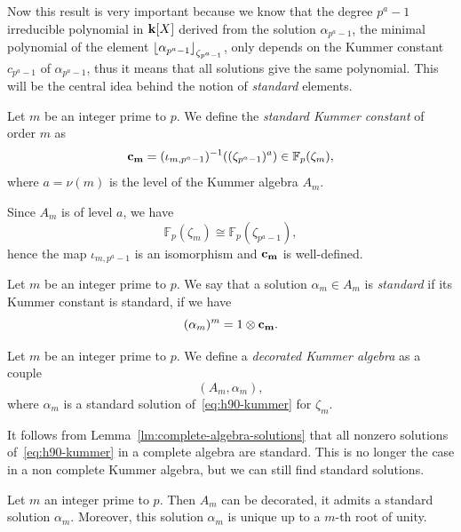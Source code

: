 Now this result is very important because we know that the degree $p^a-1$
irreducible polynomial in $\mathbf{k}[X]$ derived from the solution $\alpha_{p^a-1}$,
\ie the minimal polynomial of the element
$\left\lfloor \alpha_{p^a-1} \right\rfloor_{\zeta_{p^a-1}}$,
only depends on the Kummer constant $c_{p^a-1}$ of $\alpha_{p^a-1}$, thus it
means that all solutions give the same polynomial. This will be the central idea
behind the notion of \emph{standard} elements.
\begin{defi}
  Let $m$ be an integer prime to $p$. We define the \emph{standard Kummer
  constant} of order $m$ as
  \[
    \mathbf{c_{m}} = (\iota_{m,
    p^a-1})^{-1}((\zeta_{p^a-1})^a)\in\mathbb{F}_{p}(\zeta_m),
  \]
  where $a=\nu(m)$ is the level of the Kummer algebra $A_m$.
\end{defi}
\begin{rem}
 Since $A_m$ is of level $a$, we have
 \[
   \mathbb{F}_p(\zeta_m) \cong \mathbb{F}_p(\zeta_{p^a-1}),
 \]
 hence the map $\iota_{m, p^a-1}$ is an isomorphism and $\mathbf{c_{m}}$ is
 well-defined.
\end{rem}
\begin{defi}
  Let $m$ be an integer prime to $p$. We say that a solution $\alpha_m\in A_m$
  is \emph{standard} if its Kummer constant is standard, \ie if we have
  \[
    (\alpha_m)^m = 1\otimes\mathbf{c_{m}}.
  \]
\end{defi}
\begin{defi}
  Let $m$ be an integer prime to $p$. We define a \emph{decorated Kummer
  algebra} as a couple
  \[
    (A_m, \alpha_m),
  \]
  where $\alpha_m$ is a standard solution of~\eqref{eq:h90-kummer} for
  $\zeta_m$.
\end{defi}
It follows from Lemma~\ref{lm:complete-algebra-solutions} that all nonzero
solutions of~\eqref{eq:h90-kummer} in a complete algebra are standard. This is
no longer the case in a non complete Kummer algebra, but we can still find
standard solutions.
\begin{prop}
  \label{prop:decoration}
 Let $m$ an integer prime to $p$. Then $A_m$ can be decorated, \ie it admits a
 standard solution $\alpha_m$. Moreover, this solution $\alpha_m$ is unique up
 to a $m$-th root of unity. 
\end{prop}
